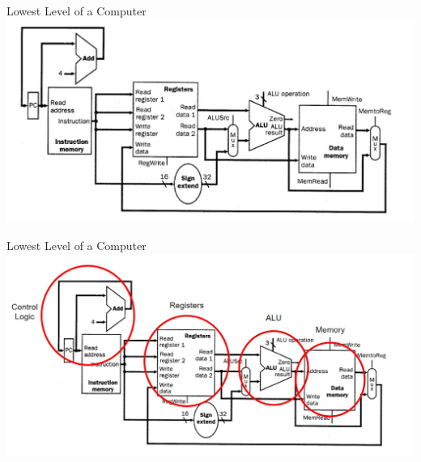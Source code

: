 \documentclass[aspectratio=169]{beamer}
\begin{document}
\begin{frame}{Lowest Level of a Computer}
    \includegraphics[width=\textwidth]{imgs/vis_3.jpg}
\end{frame}

\begin{frame}{Lowest Level of a Computer}
    \includegraphics[width=\textwidth]{imgs/vis_4.jpg}
\end{frame}
\end{document}

